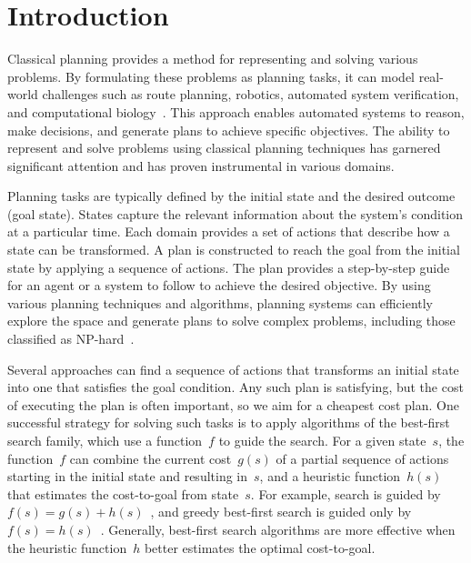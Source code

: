 \chapter{Introduction}
\label{sec:intro}

Classical planning provides a method for representing and solving various problems. By formulating these problems as planning tasks, it can model real-world challenges such as route planning, robotics, automated system verification, and computational biology~\cite{Edelkamp.etal/2012}. This approach enables automated systems to reason, make decisions, and generate plans to achieve specific objectives. The ability to represent and solve problems using classical planning techniques has garnered significant attention and has proven instrumental in various domains.

Planning tasks are typically defined by the initial state and the desired outcome (goal state). States capture the relevant information about the system's condition at a particular time. Each domain provides a set of actions that describe how a state can be transformed. A plan is constructed to reach the goal from the initial state by applying a sequence of actions. The plan provides a step-by-step guide for an agent or a system to follow to achieve the desired objective. By using various planning techniques and algorithms, planning systems can efficiently explore the space and generate plans to solve complex problems, including those classified as NP-hard~\cite{bylander1994computational}.

Several approaches can find a sequence of actions that transforms an initial state into one that satisfies the goal condition. Any such plan is satisfying, but the cost of executing the plan is often important, so we aim for a cheapest cost plan. One successful strategy for solving such tasks is to apply algorithms of the best-first search family, which use a function~$f$ to guide the search. For a given state~$s$, the function~$f$ can combine the current cost~$g(s)$ of a partial sequence of actions starting in the initial state and resulting in~$s$, and a heuristic function~$h(s)$ that estimates the cost-to-goal from state~$s$. For example, \astar search is guided by $f(s)=g(s)+h(s)$~\cite{hart-et-al-ieeessc1968}, and greedy best-first search is guided only by $f(s)=h(s)$~\cite{doran-michie-rsl1966}. Generally, best-first search algorithms are more effective when the heuristic function~$h$ better estimates the optimal cost-to-goal.

